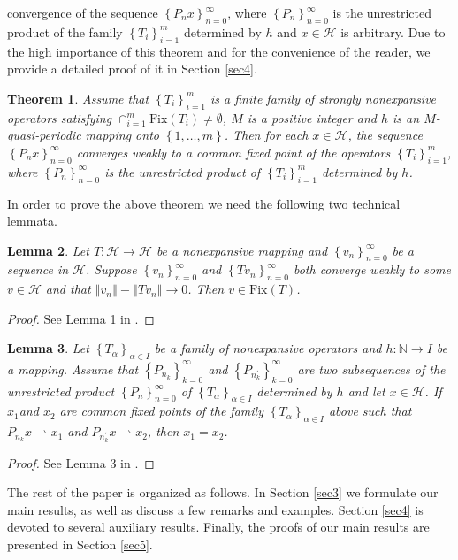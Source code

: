 \documentclass[]{interact}
\theoremstyle{plain}%
\newtheorem{theorem}{Theorem}[section]
\newtheorem{lemma}[theorem]{Lemma}
\theoremstyle{definition}
\theoremstyle{remark}
\begin{document}
convergence of the sequence $\left\{ P_{n}x\right\} _{n=0}^{\infty}$,
where $\left\{ P_{n}\right\} _{n=0}^{\infty}$ is the \color{black}unrestricted \color{black} product
of the family $\left\{ T_{i}\right\} _{i=1}^{m}$ determined by $h$
and $x\in\mathcal{H}$ is arbitrary. Due to the high importance of
this theorem and for the convenience of the reader, we provide a detailed
proof of it in Section \ref{sec4}.
\begin{theorem}
\label{thm6 in DR}Assume that $\left\{ T_{i}\right\} _{i=1}^{m}$
is a finite family of strongly nonexpansive operators satisfying $\cap_{i=1}^{m}\mathrm{Fix}(T_{i})\not=\emptyset$,
$M$ is a positive integer and $h$ is an $M$-quasi-periodic mapping
onto $\left\{ 1,\dots,m\right\} $. Then for each $x\in\mathcal{H}$,
the sequence $\left\{ P_{n}x\right\} _{n=0}^{\infty}$ converges weakly
to a common fixed point of the operators $\left\{ T_{i}\right\} _{i=1}^{m}$,
where $\left\{ P_{n}\right\} _{n=0}^{\infty}$ is the \color{black}unrestricted \color{black} product
of $\left\{ T_{i}\right\} _{i=1}^{m}$ determined by $h$.
\end{theorem}
In order to prove the above theorem we need the following two technical
lemmata.
\begin{lemma}
\label{Lemma 1 in DR}Let $T:\mathcal{H}\rightarrow\mathcal{H}$ be
a nonexpansive mapping and $\left\{ v_{n}\right\} _{n=0}^{\infty}$
be a sequence in $\mathcal{H}$. Suppose $\left\{ v_{n}\right\} _{n=0}^{\infty}$
and $\left\{ Tv_{n}\right\} _{n=0}^{\infty}$ both converge weakly
to some $v\in\mathcal{H}$ and that $\left\Vert v_{n}\right\Vert -\left\Vert Tv_{n}\right\Vert \rightarrow0$.
Then $v\in\mathrm{Fix}(T)$.
\end{lemma}
\begin{proof}
See Lemma 1 in \cite{key-1}.
\end{proof}
\begin{lemma}
\label{Lemma 3 in DR}Let $\left\{ T_{\alpha}\right\} _{\alpha\in I}$
be a family of nonexpansive operators and $h:\mathbb{N}\rightarrow I$
be a mapping. Assume that $\left\{ P_{n_{k}}\right\} _{k=0}^{\infty}$
and $\left\{ P_{n_{k}^{\prime}}\right\} _{k=0}^{\infty}$ are two
subsequences of the \color{black}unrestricted \color{black} product $\left\{ P_{n}\right\} _{n=0}^{\infty}$
of $\left\{ T_{\alpha}\right\} _{\alpha\in I}$ determined by $h$
and let $x\in\mathcal{H}$. If $x_{1}$and $x_{2}$ are common fixed
points of the family $\left\{ T_{\alpha}\right\} _{\alpha\in I}$
above such that $P_{n_{k}}x\rightharpoonup x_{1}$ and $P_{n_{k}^{\prime}}x\rightharpoonup x_{2}$,
then $x_{1}=x_{2}$.
\end{lemma}
\begin{proof}
See Lemma 3 in \cite{key-1}.
\end{proof}
The rest of the paper is organized as follows. In Section \ref{sec3}
we formulate our main results, as well as discuss a few remarks and
examples. Section \ref{sec4} is devoted to several auxiliary results. Finally, the proofs of our main results are presented in Section \ref{sec5}.
\end{document}
